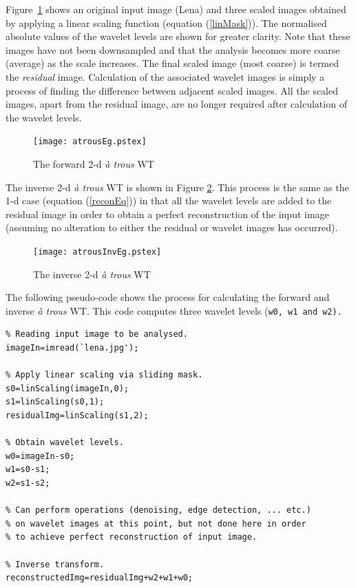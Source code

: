 \documentclass[12pt]{report}
\renewcommand{\baselinestretch}{1.5}
\begin{document}
Figure~\ref{atrousEg} shows an original input image (Lena) and three scaled images obtained
by applying a linear scaling function (equation (\ref{linMask})). 
The normalised absolute values of the wavelet levels are shown for greater clarity.
Note that these images have 
not been downsampled and that the analysis becomes more coarse (average) as the scale increases.
The final scaled image (most coarse) is termed the \emph{residual} image.
Calculation of the associated wavelet images is simply a process of finding the difference
between adjacent scaled images.
All the scaled images, apart from the residual image, are no longer required after calculation
of the wavelet levels. 
\begin{figure}[!ht]
        \begin{center}
                \texttt{[image: atrousEg.pstex]}
        \end{center}
        \caption{The forward 2-d \emph{\`a trous} WT}
        \label{atrousEg}
\end{figure}

The inverse 2-d \emph{\`a trous} WT is shown in Figure \ref{atrousInvEg}. This process
is the same as the 1-d case (equation (\ref{reconEq})) in that all the wavelet levels are added to the residual image in 
order to obtain a perfect reconstruction of the input image (assuming no alteration to either the residual or wavelet 
images has occurred).
\begin{figure}[htb]
        \begin{center}
                \texttt{[image: atrousInvEg.pstex]}
		\caption{The inverse 2-d \emph{\`a trous} WT}
		\label{atrousInvEg}		
        \end{center}
\end{figure}

The following pseudo-code shows the process for calculating the forward and 
inverse \emph{\`a trous} WT. 
This code computes three wavelet levels (\tt \footnotesize w0, w1 \normalsize \rm and \tt \footnotesize w2\normalsize \rm).

\noindent
\begin{minipage}[t]{15cm}
\renewcommand{\baselinestretch}{1}
\footnotesize
\begin{verbatim}
% Reading input image to be analysed.	
imageIn=imread(`lena.jpg');	

% Apply linear scaling via sliding mask. 
s0=linScaling(imageIn,0); 	
s1=linScaling(s0,1);		
residualImg=linScaling(s1,2);	

% Obtain wavelet levels.
w0=imageIn-s0;	
w1=s0-s1;	
w2=s1-s2;	

% Can perform operations (denoising, edge detection, ... etc.)	
% on wavelet images at this point, but not done here in order	
% to achieve perfect reconstruction of input image.		

% Inverse transform.	
reconstructedImg=residualImg+w2+w1+w0;	
\end{verbatim}		
\normalsize		
\end{minipage}	%
\renewcommand{\baselinestretch}{1.5}
\end{document}

